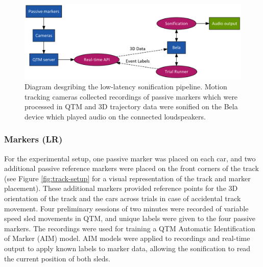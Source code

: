 \documentclass[10pt,a4paper,onecolumn]{article}
\begin{document}
\begin{figure}[h]

{\centering \includegraphics[width=1\linewidth]{figures/exp-graph} 

}

\caption{Diagram desgribing the low-latency sonification pipeline. Motion tracking cameras collected recordings of passive markers which were processed in QTM and 3D trajectory data were sonified on the Bela device which played audio on the connected loudspeakers.}\label{fig:exp-graph}
\end{figure}

\hypertarget{markers-lr}{%
\subsubsection{Markers (LR)}\label{markers-lr}}

For the experimental setup, one passive marker was placed on each car, and two additional passive reference markers were placed on the front corners of the track (see Figure \ref{fig:track-setup} for a visual representation of the track and marker placement). These additional markers provided reference points for the 3D orientation of the track and the cars across trials in case of accidental track movement. Four preliminary sessions of two minutes were recorded of variable speed sled movements in QTM, and unique labels were given to the four passive markers. The recordings were used for training a QTM Automatic Identification of Marker (AIM) model. AIM models were applied to recordings and real-time output to apply known labels to marker data, allowing the sonification to read the current position of both sleds.
\end{document}
